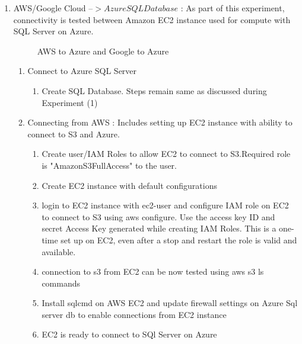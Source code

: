 \documentclass[journal]{hybrid-cloud}
\begin{document}
\begin{enumerate}
	\item AWS/Google Cloud –\(> Azure SQL Database \) : As part of this experiment, connectivity is tested between Amazon EC2 instance used for compute with SQL Server on Azure. 
	
	\begin{figure}[h]	
    	\caption{\label{fig:AWS_Google_AzureDB} AWS to Azure and Google to Azure}
	\end{figure}
	
	\begin{enumerate} 
 		\item Connect to Azure SQL Server 
 		\begin{enumerate}
 			\item Create SQL Database. Steps remain same as discussed during Experiment (1)
 				
 		\end{enumerate}
 		
 		\item Connecting from AWS : Includes setting up EC2 instance with ability to connect to S3 and Azure.
 		\begin{enumerate}
 			\item Create user/IAM Roles to allow EC2 to connect to S3.Required role is "AmazonS3FullAccess" to the user.
 			\item Create EC2 instance with default configurations
 			\item login to EC2 instance with ec2-user and configure IAM role on EC2 to connect to S3 using aws configure. Use the access key ID and secret Access Key generated while creating IAM Roles. This is a one-time set up on EC2, even after a stop and restart the role is valid and available.
 			\item connection to s3 from EC2 can be now tested using aws s3 ls commands
 			\item Install sqlcmd on AWS EC2 and update firewall settings on Azure Sql server db to enable connections from EC2 instance
 			\item EC2 is ready to connect to SQl Server on Azure
 			

\end{enumerate}
\end{enumerate}
\end{enumerate}
\end{document}

